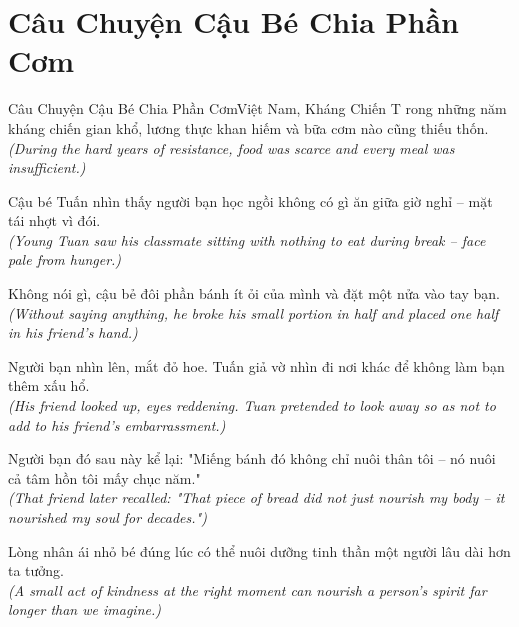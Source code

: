 \section{Câu Chuyện Cậu Bé Chia Phần Cơm}
\begin{truyen}{Câu Chuyện Cậu Bé Chia Phần Cơm}{Việt Nam, Kháng Chiến}
T rong những năm kháng chiến gian khổ, lương thực khan hiếm và bữa cơm nào cũng thiếu thốn.\\
\textit{(During the hard years of resistance, food was scarce and every meal was insufficient.)}

Cậu bé Tuấn nhìn thấy người bạn học ngồi không có gì ăn giữa giờ nghỉ -- mặt tái nhợt vì đói.\\
\textit{(Young Tuan saw his classmate sitting with nothing to eat during break -- face pale from hunger.)}

Không nói gì, cậu bẻ đôi phần bánh ít ỏi của mình và đặt một nửa vào tay bạn.\\
\textit{(Without saying anything, he broke his small portion in half and placed one half in his friend's hand.)}

Người bạn nhìn lên, mắt đỏ hoe. Tuấn giả vờ nhìn đi nơi khác để không làm bạn thêm xấu hổ.\\
\textit{(His friend looked up, eyes reddening. Tuan pretended to look away so as not to add to his friend's embarrassment.)}

Người bạn đó sau này kể lại: "Miếng bánh đó không chỉ nuôi thân tôi -- nó nuôi cả tâm hồn tôi mấy chục năm."\\
\textit{(That friend later recalled: "That piece of bread did not just nourish my body -- it nourished my soul for decades.")}

\end{truyen}
\begin{baihoc}
  Lòng nhân ái nhỏ bé đúng lúc có thể nuôi dưỡng tinh thần một người lâu dài hơn ta tưởng.\\
  \textit{(A small act of kindness at the right moment can nourish a person's spirit far longer than we imagine.)}
\end{baihoc}

